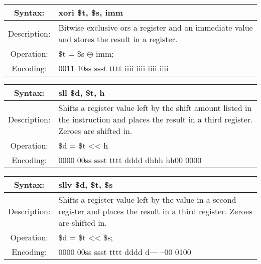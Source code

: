     \begin{table}[!hbp]
    \begin{tabularx}{\textwidth}{|c|X|}
        \hline
        Syntax: & xori \$t, \$s, imm \\
        \hline
        Description: & Bitwise exclusive ors a register and an immediate
                         value and stores the result in a register. \\
        \hline
        Operation: & \$t = \$s $\oplus$ imm; \\
        \hline
        Encoding: & 0011 10ss ssst tttt iiii iiii iiii iiii \\
        \hline
    \end{tabularx}
    \end{table}

    \begin{table}[!hbp]
    \begin{tabularx}{\textwidth}{|c|X|}
        \hline
        Syntax: & sll \$d, \$t, h \\
        \hline
        Description: & Shifts a register value left by the shift amount listed in 
                        the instruction and places the result in a third register.
                         Zeroes are shifted in. \\
        \hline
        Operation: & \$d = \$t << h \\
        \hline
        Encoding: & 0000 00ss ssst tttt dddd dhhh hh00 0000 \\
        \hline
    \end{tabularx}
    \end{table}

    \begin{table}[!hbp]
    \begin{tabularx}{\textwidth}{|c|X|}
        \hline
        Syntax: & sllv \$d, \$t, \$s \\
        \hline
        Description: & Shifts a register value left by the value 
                        in a second register and places the result 
                        in a third register. Zeroes are shifted in. \\
        \hline
        Operation: & \$d = \$t << \$s; \\
        \hline
        Encoding: & 0000 00ss ssst tttt dddd d--- --00 0100 \\
        \hline
    \end{tabularx}
    \end{table}

